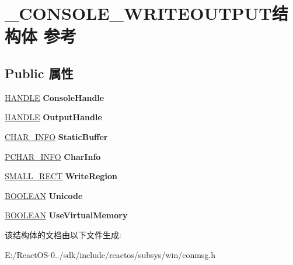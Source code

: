 \hypertarget{struct___c_o_n_s_o_l_e___w_r_i_t_e_o_u_t_p_u_t}{}\section{\+\_\+\+C\+O\+N\+S\+O\+L\+E\+\_\+\+W\+R\+I\+T\+E\+O\+U\+T\+P\+U\+T结构体 参考}
\label{struct___c_o_n_s_o_l_e___w_r_i_t_e_o_u_t_p_u_t}
\subsection*{Public 属性}
\begin{DoxyCompactItemize}
\item 
\mbox{\label{struct___c_o_n_s_o_l_e___w_r_i_t_e_o_u_t_p_u_t_a10b59dfb1d9e8b499ccb85279163d152}} 
\hyperlink{interfacevoid}{H\+A\+N\+D\+LE} {\bfseries Console\+Handle}
\item 
\mbox{\label{struct___c_o_n_s_o_l_e___w_r_i_t_e_o_u_t_p_u_t_a99d551ad717a8a6f889b57f73944d88e}} 
\hyperlink{interfacevoid}{H\+A\+N\+D\+LE} {\bfseries Output\+Handle}
\item 
\mbox{\label{struct___c_o_n_s_o_l_e___w_r_i_t_e_o_u_t_p_u_t_acd9eda0b0fd93062b328aa2885c0b2e1}} 
\hyperlink{struct___c_h_a_r___i_n_f_o}{C\+H\+A\+R\+\_\+\+I\+N\+FO} {\bfseries Static\+Buffer}
\item 
\mbox{\label{struct___c_o_n_s_o_l_e___w_r_i_t_e_o_u_t_p_u_t_ad70e8d262ad8f5d6e8974c83ac57af37}} 
\hyperlink{struct___c_h_a_r___i_n_f_o}{P\+C\+H\+A\+R\+\_\+\+I\+N\+FO} {\bfseries Char\+Info}
\item 
\mbox{\label{struct___c_o_n_s_o_l_e___w_r_i_t_e_o_u_t_p_u_t_a45729a63bfb12ef207051248eb248917}} 
\hyperlink{structtag_s_m_a_l_l___r_e_c_t}{S\+M\+A\+L\+L\+\_\+\+R\+E\+CT} {\bfseries Write\+Region}
\item 
\mbox{\label{struct___c_o_n_s_o_l_e___w_r_i_t_e_o_u_t_p_u_t_ab8dd0d8bd1ba7d4b9f526dcaf47f9bab}} 
\hyperlink{_processor_bind_8h_a112e3146cb38b6ee95e64d85842e380a}{B\+O\+O\+L\+E\+AN} {\bfseries Unicode}
\item 
\mbox{\label{struct___c_o_n_s_o_l_e___w_r_i_t_e_o_u_t_p_u_t_a490af24a1654260d50db8b8c421c42d6}} 
\hyperlink{_processor_bind_8h_a112e3146cb38b6ee95e64d85842e380a}{B\+O\+O\+L\+E\+AN} {\bfseries Use\+Virtual\+Memory}
\end{DoxyCompactItemize}


该结构体的文档由以下文件生成\+:\begin{DoxyCompactItemize}
\item 
E\+:/\+React\+O\+S-\/0../sdk/include/reactos/subsys/win/conmsg.\+h\end{DoxyCompactItemize}
